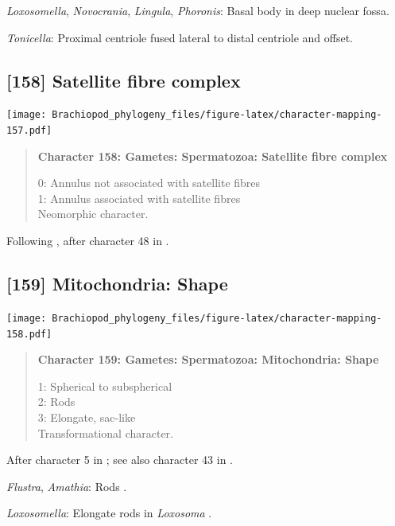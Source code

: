 \documentclass[openany]{book}
\begin{document}
\hypertarget{Lingula-coding-157}{}
\emph{Loxosomella}, \emph{Novocrania}, \emph{Lingula}, \emph{Phoronis}:
Basal body in deep nuclear fossa.

\hypertarget{Tonicella-coding-157}{}
\emph{Tonicella}: Proximal centriole fused lateral to distal centriole
and offset.

\subsection*{{[}158{]} Satellite fibre
complex}\label{satellite-fibre-complex}

\texttt{[image: Brachiopod\_phylogeny\_files/figure-latex/character-mapping-157.pdf]}

\begin{quote}
\textbf{Character 158: Gametes: Spermatozoa: Satellite fibre complex}

0: Annulus not associated with satellite fibres\\
1: Annulus associated with satellite fibres\\
Neomorphic character.
\end{quote}

Following \citet{Smith2012}, after character 48 in \citet{Ponder1997}.

\subsection*{{[}159{]} Mitochondria: Shape}\label{mitochondria-shape}

\texttt{[image: Brachiopod\_phylogeny\_files/figure-latex/character-mapping-158.pdf]}

\begin{quote}
\textbf{Character 159: Gametes: Spermatozoa: Mitochondria: Shape}

1: Spherical to subspherical\\
2: Rods\\
3: Elongate, sac-like\\
Transformational character.
\end{quote}

After character 5 in \citet{BucklandNicks2008}; see also character 43 in
\citet{Ponder1997}.

\hypertarget{Amathia-coding-159}{}
\emph{Flustra}, \emph{Amathia}: Rods \citep{Franzen1981}.

\hypertarget{Loxosomella-coding-159}{}
\emph{Loxosomella}: Elongate rods in \emph{Loxosoma}
\citep{Franzen2000}.
\end{document}
